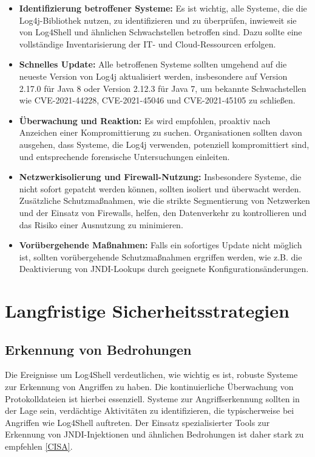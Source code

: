 \begin{itemize}
	\item \textbf{Identifizierung betroffener Systeme:} Es ist wichtig, alle Systeme, die die Log4j-Bibliothek nutzen, zu identifizieren und zu überprüfen, inwieweit sie von Log4Shell und ähnlichen Schwachstellen betroffen sind. Dazu sollte eine vollständige Inventarisierung der IT- und Cloud-Ressourcen erfolgen.
	\item \textbf{Schnelles Update:} Alle betroffenen Systeme sollten umgehend auf die neueste Version von Log4j aktualisiert werden, insbesondere auf Version 2.17.0 für Java 8 oder Version 2.12.3 für Java 7, um bekannte Schwachstellen wie CVE-2021-44228, CVE-2021-45046 und CVE-2021-45105 zu schließen.
	
	\item \textbf{Überwachung und Reaktion:} Es wird empfohlen, proaktiv nach Anzeichen einer Kompromittierung zu suchen. Organisationen sollten davon ausgehen, dass Systeme, die Log4j verwenden, potenziell kompromittiert sind, und entsprechende forensische Untersuchungen einleiten.
	
	\item \textbf{Netzwerkisolierung und Firewall-Nutzung:} Insbesondere Systeme, die nicht sofort gepatcht werden können, sollten isoliert und überwacht werden. Zusätzliche Schutzmaßnahmen, wie die strikte Segmentierung von Netzwerken und der Einsatz von Firewalls, helfen, den Datenverkehr zu kontrollieren und das Risiko einer Ausnutzung zu minimieren.
	
	\item \textbf{Vorübergehende Maßnahmen:} Falls ein sofortiges Update nicht möglich ist, sollten vorübergehende Schutzmaßnahmen ergriffen werden, wie z.B. die Deaktivierung von JNDI-Lookups durch geeignete Konfigurationsänderungen.
\end{itemize}

\section{Langfristige Sicherheitsstrategien}

\subsection{Erkennung von Bedrohungen}

Die Ereignisse um Log4Shell verdeutlichen, wie wichtig es ist, robuste Systeme zur Erkennung von Angriffen zu haben. Die kontinuierliche Überwachung von Protokolldateien ist hierbei essenziell. Systeme zur Angriffserkennung sollten in der Lage sein, verdächtige Aktivitäten zu identifizieren, die typischerweise bei Angriffen wie Log4Shell auftreten. Der Einsatz spezialisierter Tools zur Erkennung von JNDI-Injektionen und ähnlichen Bedrohungen ist daher stark zu empfehlen \hyperref[bib:CISA]{[CISA]}.

